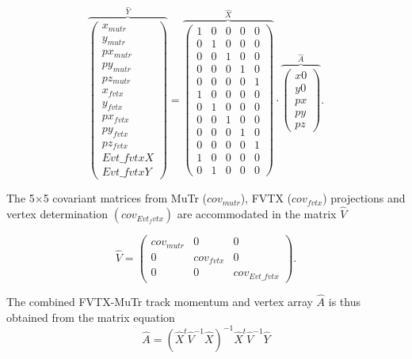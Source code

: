 \documentclass[12pt]{article}
\begin{document}
\begin{equation}
\overbrace{\left(\begin{array}{c}x_{mutr}\\y_{mutr}\\px_{mutr}\\py_{mutr}\\pz_{mutr}\\x_{fvtx}\\y_{fvtx}\\px_{fvtx}\\py_{fvtx}\\pz_{fvtx}\\ Evt\_fvtxX\\ Evt\_fvtxY\end{array}\right)}^{\hat{Y}} 
= \overbrace{\left(\begin{array}{ccccc}1&0&0&0&0\\ 0&1&0&0&0\\ 0&0&1&0&0\\ 0&0&0&1&0\\ 0&0&0&0&1\\1&0&0&0&0\\ 0&1&0&0&0\\ 0&0&1&0&0\\ 0&0&0&1&0\\ 0&0&0&0&1\\1&0&0&0&0\\0&1&0&0&0  \end{array}\right)}^{\hat{X}}
\cdot \overbrace{\left(\begin{array}{c} x0\\ y0 \\ px \\ py \\ pz \end{array} \right)}^{\hat{A}}.
\end{equation}

The 5$\times$5 covariant matrices from MuTr ($cov_{mutr}$), FVTX ($cov_{fvtx}$) projections and vertex determination $(cov_{Evt_fvtx})$ are accommodated in the matrix $\hat{V}$

\begin{equation}
\hat{V} = \left(\begin{array}{ccc} cov_{mutr} & 0 & 0\\ 0 & cov_{fvtx} & 0 \\ 0 & 0 & cov_{Evt\_fvtx} \end{array} \right).
\end{equation}

The combined FVTX-MuTr track momentum and vertex array $\hat{A}$ is thus obtained from the matrix equation
\begin{equation}
	\hat{A} = \left(\hat{X}^t \hat{V}^{-1} \hat{X}\right)^{-1} \hat{X}^t \hat{V}^{-1}\hat{Y}
\end{equation}
\end{document}
